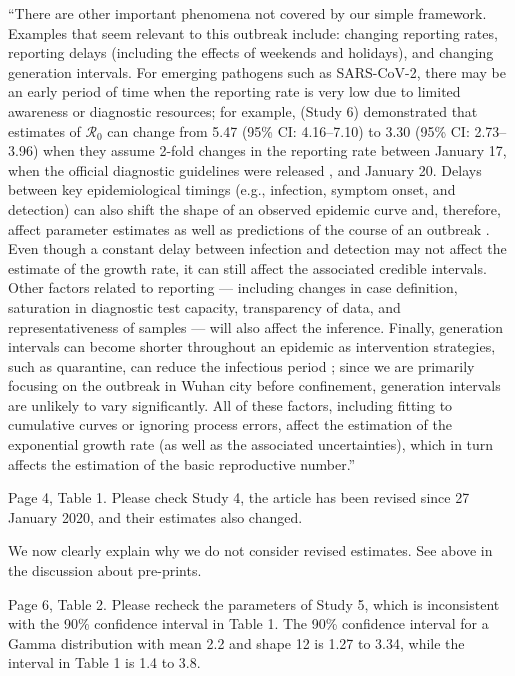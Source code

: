 \documentclass[12pt]{article}
\newcommand{\Ro}{\ensuremath{{\mathcal R}_{0}}\xspace}
\newcommand{\revtext}{\textsf}
\begin{document}
``There are other important phenomena not covered by our simple framework.
Examples that seem relevant to this outbreak include: changing reporting rates, reporting delays (including the effects of weekends and holidays), and changing generation intervals.
For emerging pathogens such as SARS-CoV-2, there may be an early period of time when the reporting rate is very low due to limited awareness or diagnostic resources;
for example, \cite{zhaoncov} (Study 6) demonstrated that estimates of \Ro can change from 5.47 (95\% CI: 4.16--7.10) to 3.30 (95\% CI: 2.73--3.96) when they assume 2-fold changes in the reporting rate between January 17, when the official diagnostic guidelines were released \citep{who17protocol}, and January 20.
Delays between key epidemiological timings (e.g., infection, symptom onset, and detection) can also shift the shape of an observed epidemic curve and, therefore, affect parameter estimates as well as predictions of the course of an outbreak \citep{tariq2019assessing}.
Even though a constant delay between infection and detection may not affect the estimate of the growth rate, it can still affect the associated credible intervals.
Other factors related to reporting --- including changes in case definition, saturation in diagnostic test capacity, transparency of data, and representativeness of samples --- will also affect the inference.
Finally, generation intervals can become shorter throughout an epidemic as intervention strategies, such as quarantine, can reduce the infectious period \citep{hethcote2002effects};
since we are primarily focusing on the outbreak in Wuhan city before confinement, generation intervals are unlikely to vary significantly.
All of these factors, including fitting to cumulative curves or ignoring process errors, affect the estimation of the exponential growth rate (as well as the associated uncertainties), which in turn affects the estimation of the basic reproductive number.''

\revtext{Page 4, Table 1. Please check Study 4, the article has been revised since 27 January 2020,
and their estimates also changed.}

We now clearly explain why we do not consider revised estimates. See above in the discussion about pre-prints. 

\revtext{Page 6, Table 2. Please recheck the parameters of Study 5, which is inconsistent with the 90\%
confidence interval in Table 1. The 90\% confidence interval for a Gamma distribution with mean
2.2 and shape 12 is 1.27 to 3.34, while the interval in Table 1 is 1.4 to 3.8.}
\end{document}

